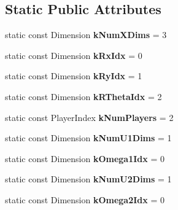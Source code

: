 \subsection*{Static Public Attributes}
\begin{DoxyCompactItemize}
\item 
static const Dimension {\bfseries k\+Num\+X\+Dims} = 3\hypertarget{classilqgames_1_1_air3_d_ace8a3c3f0ec52564f18fcbbf543e9186}{}\label{classilqgames_1_1_air3_d_ace8a3c3f0ec52564f18fcbbf543e9186}

\item 
static const Dimension {\bfseries k\+Rx\+Idx} = 0\hypertarget{classilqgames_1_1_air3_d_ac678bc9df6e03301d2246b2ac9703b8a}{}\label{classilqgames_1_1_air3_d_ac678bc9df6e03301d2246b2ac9703b8a}

\item 
static const Dimension {\bfseries k\+Ry\+Idx} = 1\hypertarget{classilqgames_1_1_air3_d_ad315ffe7f7edd1e219f1aa2c1a37eda6}{}\label{classilqgames_1_1_air3_d_ad315ffe7f7edd1e219f1aa2c1a37eda6}

\item 
static const Dimension {\bfseries k\+R\+Theta\+Idx} = 2\hypertarget{classilqgames_1_1_air3_d_a42cc1c80b1230ace642004b11e43e982}{}\label{classilqgames_1_1_air3_d_a42cc1c80b1230ace642004b11e43e982}

\item 
static const Player\+Index {\bfseries k\+Num\+Players} = 2\hypertarget{classilqgames_1_1_air3_d_a31257940faeb1f4fc1394a8a1fe2bcc9}{}\label{classilqgames_1_1_air3_d_a31257940faeb1f4fc1394a8a1fe2bcc9}

\item 
static const Dimension {\bfseries k\+Num\+U1\+Dims} = 1\hypertarget{classilqgames_1_1_air3_d_acde42330125b1a9240c9835a2b671243}{}\label{classilqgames_1_1_air3_d_acde42330125b1a9240c9835a2b671243}

\item 
static const Dimension {\bfseries k\+Omega1\+Idx} = 0\hypertarget{classilqgames_1_1_air3_d_aa9cbffd46b50700ecca54322ff189883}{}\label{classilqgames_1_1_air3_d_aa9cbffd46b50700ecca54322ff189883}

\item 
static const Dimension {\bfseries k\+Num\+U2\+Dims} = 1\hypertarget{classilqgames_1_1_air3_d_aecbd7e60b4d74e501918ae8744a82224}{}\label{classilqgames_1_1_air3_d_aecbd7e60b4d74e501918ae8744a82224}

\item 
static const Dimension {\bfseries k\+Omega2\+Idx} = 0\hypertarget{classilqgames_1_1_air3_d_a5bd65039675cb9fb05b0d30346b0e9a5}{}\label{classilqgames_1_1_air3_d_a5bd65039675cb9fb05b0d30346b0e9a5}

\end{DoxyCompactItemize}
